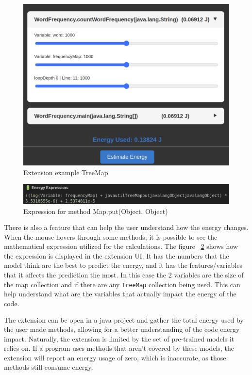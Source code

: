 \begin{figure}[htbp]
  \centering
  \includegraphics[width = .8 \textwidth]{figures/extension_example2.png}
  \caption{Extension example TreeMap}
  \label{fig:extension_example2}
\end{figure}



\begin{figure}[htbp]
  \centering
  \includegraphics[width = .8 \textwidth]{figures/extension_expression_example.png}
  \caption{Expression for method Map.put(Object, Object)}
  \label{fig:extension_expression_example}
\end{figure}

There is also a feature that can help the user understand how the energy changes. When the mouse hovers through some methods, it is possible to see the mathematical expression utilized for the calculations. The figure ~\ref{fig:extension_expression_example} shows how the expression is displayed in the extension UI. It has the numbers that the model think are the best to predict the energy, and it has the features/variables that it affects the prediction the most. In this case the 2 variables are the size of the map collection and if there are any \texttt{TreeMap} collection being used. This can help understand what are the variables that actually impact the energy of the code. 

The extension can be open in a java project and gather the total energy used by the user made methods, allowing for a better understanding of the code energy impact. Naturally, the extension is limited by the set of pre-trained models it relies on. If a program uses methods that aren't covered by these models, the extension will report an energy usage of zero, which is inaccurate, as those methods still consume energy.